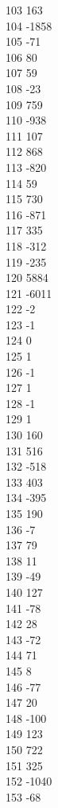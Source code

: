 { 103	163 \\
 104	-1858 \\
 105	-71 \\
 106	80 \\
 107	59 \\
 108	-23 \\
 109	759 \\
 110	-938 \\
 111	107 \\
 112	868 \\
 113	-820 \\
 114	59 \\
 115	730 \\
 116	-871 \\
 117	335 \\
 118	-312 \\
 119	-235 \\
 120	5884 \\
 121	-6011 \\
 122	-2 \\
 123	-1 \\
 124	0 \\
 125	1 \\
 126	-1 \\
 127	1 \\
 128	-1 \\
 129	1 \\
 130	160 \\
 131	516 \\
 132	-518 \\
 133	403 \\
 134	-395 \\
 135	190 \\
 136	-7 \\
 137	79 \\
 138	11 \\
 139	-49 \\
 140	127 \\
 141	-78 \\
 142	28 \\
 143	-72 \\
 144	71 \\
 145	8 \\
 146	-77 \\
 147	20 \\
 148	-100 \\
 149	123 \\
 150	722 \\
 151	325 \\
 152	-1040 \\
 153	-68 \\
}
